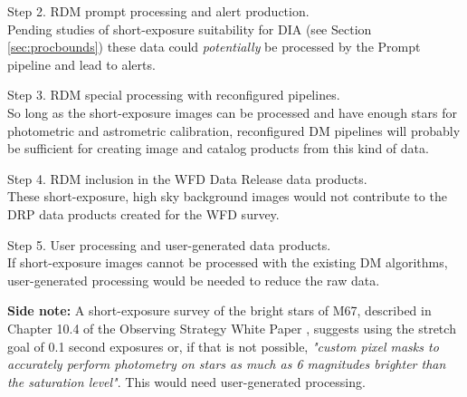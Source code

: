 Step 2. RDM prompt processing and alert production. \\
Pending studies of short-exposure suitability for DIA (see Section \ref{sec:procbounds}) 
these data could {\it potentially} be processed by the Prompt pipeline and lead to alerts.

Step 3. RDM special processing with reconfigured pipelines. \\
So long as the short-exposure images can be processed and have enough stars for photometric 
and astrometric calibration, reconfigured DM pipelines will probably be sufficient for 
creating image and catalog products from this kind of data.

Step 4. RDM inclusion in the WFD Data Release data products. \\
These short-exposure, high sky background images would not contribute to the DRP data products created for the WFD survey.

Step 5. User processing and user-generated data products. \\
If short-exposure images cannot be processed with the existing DM algorithms, 
user-generated processing would be needed to reduce the raw data. 

\textbf{Side note:} A short-exposure survey of the bright stars of M67, described in Chapter 10.4 of the 
Observing Strategy White Paper \citep{2017arXiv170804058L}, suggests using the stretch goal of 
0.1 second exposures or, if that is not possible, \textit{"custom pixel masks to accurately perform 
photometry on stars as much as 6 magnitudes brighter than the saturation level"}. 
This would need user-generated processing.

